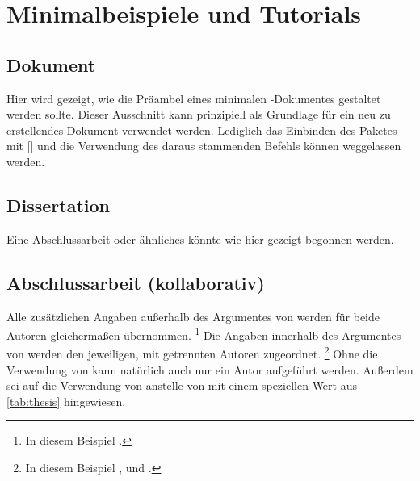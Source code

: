 \chapter{Minimalbeispiele und Tutorials}
%
%
%
\section{Dokument}
%
%
Hier wird gezeigt, wie die Präambel eines minimalen -Dokumentes 
gestaltet werden sollte. Dieser Ausschnitt kann prinzipiell als Grundlage für 
ein neu zu erstellendes Dokument verwendet werden. Lediglich das Einbinden des 
Paketes  mit [] und 
die Verwendung des daraus stammenden Befehls  können 
weggelassen werden.

\section{Dissertation}
%
%
%
Eine Abschlussarbeit oder ähnliches könnte wie hier gezeigt begonnen werden.

\section{Abschlussarbeit (kollaborativ)}
%
%
%
%
Alle zusätzlichen Angaben außerhalb des Argumentes von  werden 
für beide Autoren gleichermaßen übernommen.%
\footnote{In diesem Beispiel .}
Die Angaben innerhalb des Argumentes von  werden den jeweiligen, 
mit  getrennten Autoren zugeordnet.%
\footnote{%
  In diesem Beispiel ,  und 
  .
}
Ohne die Verwendung von  kann natürlich auch nur ein Autor 
aufgeführt werden. Außerdem sei auf die Verwendung von  anstelle 
von  mit einem speziellen Wert aus \autoref{tab:thesis} 
hingewiesen.

